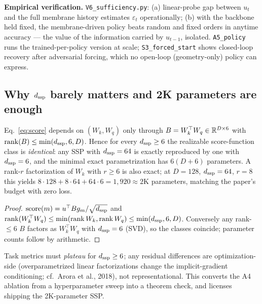 \noindent\textbf{Empirical verification.} \texttt{V6\_sufficiency.py}:
(a) linear-probe gap between $u_t$ and the full membrane history estimates
$\varepsilon_t$ operationally; (b) with the backbone held fixed, the
membrane-driven policy beats random and fixed orders in anytime accuracy
--- the value of the information carried by $u_{t-1}$, isolated.
\texttt{A5\_policy} runs the trained-per-policy version at scale;
\texttt{S3\_forced\_start} shows closed-loop recovery after adversarial
forcing, which no open-loop (geometry-only) policy can express.

\subsection{Why $d_{\mathrm{ssp}}$ barely matters and 2K parameters are enough}

\begin{theorem}\label{thm:rank}
Eq.~\eqref{eq:score} depends on $(W_k,W_q)$ only through
$B=W_k^{\top}W_q\in\mathbb{R}^{D\times 6}$ with
$\operatorname{rank}(B)\le\min(d_{\mathrm{ssp}},6,D)$. Hence for every
$d_{\mathrm{ssp}}\ge 6$ the realizable score-function class is \emph{identical}: any
SSP with $d_{\mathrm{ssp}}=64$ is exactly reproduced by one with $d_{\mathrm{ssp}}=6$, and
the minimal exact parametrization has $6(D+6)$ parameters. A rank-$r$
factorization of $W_k$ with $r\ge 6$ is also exact; at $D=128$,
$d_{\mathrm{ssp}}=64$, $r=8$ this yields $8\cdot128+8\cdot64+64\cdot6=1{,}920\approx
2\mathrm{K}$ parameters, matching the paper's budget with zero loss.
\end{theorem}
\begin{proof}
$\mathrm{score}(m)=u^{\top}Bg_m/\sqrt{d_{\mathrm{ssp}}}$ and
$\operatorname{rank}(W_k^\top W_q)\le\min(\operatorname{rank}W_k,
\operatorname{rank}W_q)\le\min(d_{\mathrm{ssp}},6,D)$. Conversely any rank-$\le 6$
$B$ factors as $W_k^{\top}W_q$ with $d_{\mathrm{ssp}}=6$ (SVD), so the classes
coincide; parameter counts follow by arithmetic.
\end{proof}

\begin{corollary}\label{cor:dssp}
Task metrics must \emph{plateau} for $d_{\mathrm{ssp}}\ge 6$; any residual
differences are optimization-side (overparametrized linear factorizations
change the implicit-gradient conditioning; cf.\ Arora et al., 2018), not
representational. This converts the A4 ablation from a hyperparameter sweep
into a theorem check, and licenses shipping the 2K-parameter SSP.
\end{corollary}

